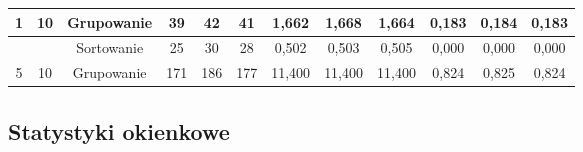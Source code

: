\documentclass[licencjacka]{pracamgr}
\begin{document}
\begin{table}[H]
{\begin{tabular}{@{}cccccccccccc@{}}
1                                                               & 10                                                      & Grupowanie & 39                                                      & 42                                                      & 41                                                         & 1,662                                                      & 1,668                                                      & 1,664                                                          & 0,183                                                              & 0,184                                                               & 0,183                                                                  \\ \midrule
                                                                &                                                         & Sortowanie & 25                                                      & 30                                                      & 28                                                         & 0,502                                                      & 0,503                                                      & 0,505                                                          & 0,000                                                              & 0,000                                                               & 0,000                                                                  \\
5                                                               & 10                                                      & Grupowanie & 171                                                     & 186                                                     & 177                                                        & 11,400                                                     & 11,400                                                     & 11,400                                                         & 0,824                                                              & 0,825                                                               & 0,824                                                                  \\ \bottomrule
\end{tabular}%
}
\end{table}

\subsection{Statystyki okienkowe}
\end{document}
